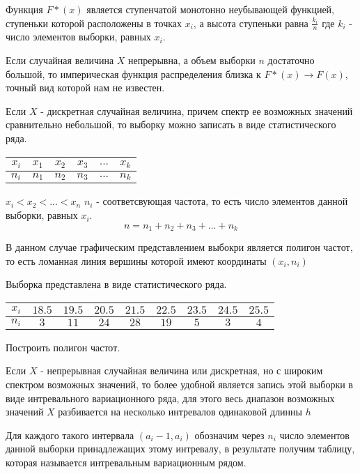 \documentclass[a4paper]{article}
\begin{document}
Функция $F*(x)$  является ступенчатой монотонно неубывающей функцией, ступеньки которой расположены в точках $x_i$,
а высота ступеньки равна $\frac{k_i}{n}$ где $k_i$ - число элементов выборки, равных $x_i$.

Если случайная величина $X$ непрерывна, а объем выборки $n$ достаточно большой, то империческая функция распределения близка к $F*(x) \rightarrow F(x)$, точный вид которой нам не известен.

Если $X$ - дискретная случайная величина, причем спектр ее возможных значений сравнительно небольшой, то выборку можно записать в виде статистического ряда.

\begin{table}[H]
\centering
\begin{tabular}{|c|c|c|c|c|c|}
\hline
$x_i$ & $x_1$ & $x_2$ & $x_3$ & $...$ & $x_k$ \\
\hline
$n_i$ & $n_1$ & $n_2$ & $n_3$ & $...$ & $n_k$ \\
\hline
\end{tabular}
\end{table}

$x_i < x_2 < ... < x_n$
$n_i$ - соответсвующая частота, то есть число элементов данной выборки, равных $x_i$.
$$ n = n_1 + n_2 + n_3 + ... + n_k $$
    
В данном случае графическим представлением выбокри является полигон частот, то есть ломанная линия вершины которой имеют координаты $(x_i, n_i)$

Выборка представлена в виде статистического ряда. 

\begin{table}[H]
\centering
\begin{tabular}{|c|c|c|c|c|c|c|c|c|}
\hline
$x_i$ & $18.5$ & $19.5$ & $20.5$  & $21.5$ & $22.5$ & $23.5$ & $24.5$ & $25.5$ \\
\hline
$n_i$ & $3$ & $11$ & $24$ & $28$ & $19$ & $5$ & $3$ & $4$\\
\hline
\end{tabular}
\end{table}

Построить полигон частот.
    
Если $X$ - непрерывная случайная величина или дискретная, но с широким спектром возможных значений, то более удобной является запись этой выборки в виде интревального вариационного ряда, для этого весь диапазон возможных значений $X$ разбивается на несколько интревалов одинаковой длинны $h$

Для каждого такого интервала $(a_i-1, a_i)$
обозначим через $n_i$ число элементов данной выборки принадлежащих этому интревалу, в результате получим таблицу, которая называется интревальным вариационным рядом.
\end{document}

